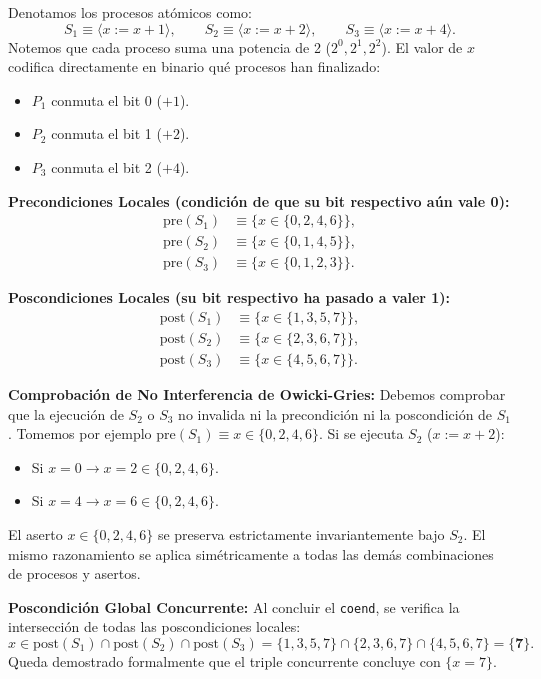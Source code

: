 \begin{solucion}
Denotamos los procesos atómicos como:
\[
S_1 \equiv \langle x := x + 1 \rangle, \qquad S_2 \equiv \langle x := x + 2 \rangle, \qquad S_3 \equiv \langle x := x + 4 \rangle.
\]
Notemos que cada proceso suma una potencia de 2 ($2^0, 2^1, 2^2$). El valor de $x$ codifica directamente en binario qué procesos han finalizado:
\begin{itemize}
    \item $P_1$ conmuta el bit 0 ($+1$).
    \item $P_2$ conmuta el bit 1 ($+2$).
    \item $P_3$ conmuta el bit 2 ($+4$).
\end{itemize}

\textbf{Precondiciones Locales (condición de que su bit respectivo aún vale 0):}
\begin{align*}
\text{pre}(S_1) &\equiv \{x \in \{0, 2, 4, 6\}\}, \\
\text{pre}(S_2) &\equiv \{x \in \{0, 1, 4, 5\}\}, \\
\text{pre}(S_3) &\equiv \{x \in \{0, 1, 2, 3\}\}.
\end{align*}

\textbf{Poscondiciones Locales (su bit respectivo ha pasado a valer 1):}
\begin{align*}
\text{post}(S_1) &\equiv \{x \in \{1, 3, 5, 7\}\}, \\
\text{post}(S_2) &\equiv \{x \in \{2, 3, 6, 7\}\}, \\
\text{post}(S_3) &\equiv \{x \in \{4, 5, 6, 7\}\}.
\end{align*}

\textbf{Comprobación de No Interferencia de Owicki-Gries:}
Debemos comprobar que la ejecución de $S_2$ o $S_3$ no invalida ni la precondición ni la poscondición de $S_1$.
Tomemos por ejemplo $\text{pre}(S_1) \equiv x \in \{0, 2, 4, 6\}$. Si se ejecuta $S_2$ ($x := x + 2$):
\begin{itemize}
    \item Si $x = 0 \to x = 2 \in \{0, 2, 4, 6\}$.
    \item Si $x = 4 \to x = 6 \in \{0, 2, 4, 6\}$.
\end{itemize}
El aserto $x \in \{0, 2, 4, 6\}$ se preserva estrictamente invariantemente bajo $S_2$. El mismo razonamiento se aplica simétricamente a todas las demás combinaciones de procesos y asertos.

\textbf{Poscondición Global Concurrente:}
Al concluir el \texttt{coend}, se verifica la intersección de todas las poscondiciones locales:
\[
x \in \text{post}(S_1) \cap \text{post}(S_2) \cap \text{post}(S_3) = \{1, 3, 5, 7\} \cap \{2, 3, 6, 7\} \cap \{4, 5, 6, 7\} = \mathbf{\{7\}}.
\]
Queda demostrado formalmente que el triple concurrente concluye con $\{x = 7\}$.
\end{solucion}

